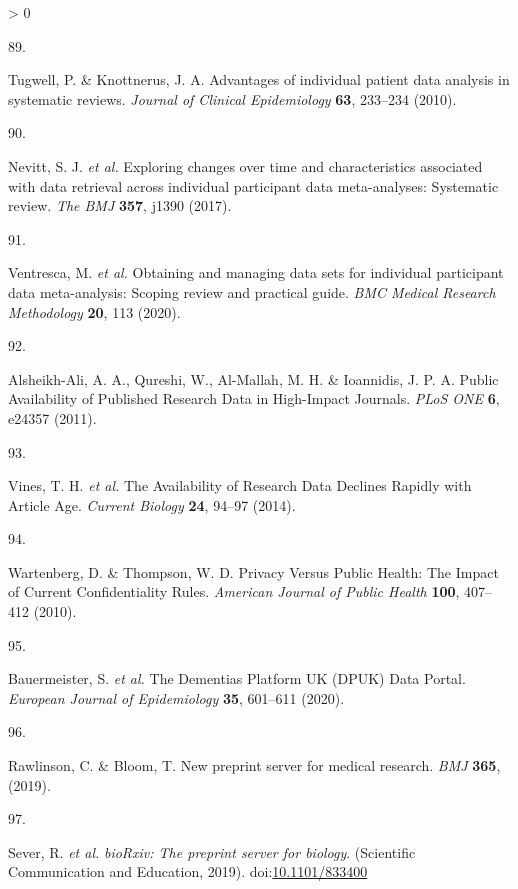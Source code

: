 \documentclass[a4paper, twoside]{templates/ociamthesis}
\newlength{\cslhangindent}
\newlength{\csllabelwidth}
\newenvironment{CSLReferences}[3] %
 {%
  \setlength{\parindent}{0pt}
  \ifodd #1 \everypar{\setlength{\hangindent}{\cslhangindent}}\ignorespaces\fi
  \ifnum #2 > 0
  \setlength{\parskip}{#2\baselineskip}
  \fi
 }%
 {}
\newcommand{\CSLLeftMargin}[1]{\parbox[t]{\maxof{\widthof{#1}}{\csllabelwidth}}{#1}}
\newcommand{\CSLRightInline}[1]{\parbox[t]{\linewidth - \csllabelwidth}{#1}}
\begin{document}
\begin{CSLReferences}{0}{0}
\leavevmode\hypertarget{ref-tugwell2010}{}%
\CSLLeftMargin{89. }
\CSLRightInline{Tugwell, P. \& Knottnerus, J. A. Advantages of individual patient data analysis in systematic reviews. \emph{Journal of Clinical Epidemiology} \textbf{63}, 233--234 (2010).}

\leavevmode\hypertarget{ref-nevitt2017a}{}%
\CSLLeftMargin{90. }
\CSLRightInline{Nevitt, S. J. \emph{et al.} Exploring changes over time and characteristics associated with data retrieval across individual participant data meta-analyses: Systematic review. \emph{The BMJ} \textbf{357}, j1390 (2017).}

\leavevmode\hypertarget{ref-ventresca2020}{}%
\CSLLeftMargin{91. }
\CSLRightInline{Ventresca, M. \emph{et al.} Obtaining and managing data sets for individual participant data meta-analysis: Scoping review and practical guide. \emph{BMC Medical Research Methodology} \textbf{20}, 113 (2020).}

\leavevmode\hypertarget{ref-alsheikh-ali2011}{}%
\CSLLeftMargin{92. }
\CSLRightInline{Alsheikh-Ali, A. A., Qureshi, W., Al-Mallah, M. H. \& Ioannidis, J. P. A. Public {Availability} of {Published Research Data} in {High}-{Impact Journals}. \emph{PLoS ONE} \textbf{6}, e24357 (2011).}

\leavevmode\hypertarget{ref-vines2014}{}%
\CSLLeftMargin{93. }
\CSLRightInline{Vines, T. H. \emph{et al.} The {Availability} of {Research Data Declines Rapidly} with {Article Age}. \emph{Current Biology} \textbf{24}, 94--97 (2014).}

\leavevmode\hypertarget{ref-wartenberg2010}{}%
\CSLLeftMargin{94. }
\CSLRightInline{Wartenberg, D. \& Thompson, W. D. Privacy {Versus Public Health}: {The Impact} of {Current Confidentiality Rules}. \emph{American Journal of Public Health} \textbf{100}, 407--412 (2010).}

\leavevmode\hypertarget{ref-bauermeister2020}{}%
\CSLLeftMargin{95. }
\CSLRightInline{Bauermeister, S. \emph{et al.} The {Dementias Platform UK} ({DPUK}) {Data Portal}. \emph{European Journal of Epidemiology} \textbf{35}, 601--611 (2020).}

\leavevmode\hypertarget{ref-rawlinson2019}{}%
\CSLLeftMargin{96. }
\CSLRightInline{Rawlinson, C. \& Bloom, T. New preprint server for medical research. \emph{BMJ} \textbf{365}, (2019).}

\leavevmode\hypertarget{ref-sever2019}{}%
\CSLLeftMargin{97. }
\CSLRightInline{Sever, R. \emph{et al.} \emph{{bioRxiv}: The preprint server for biology}. ({Scientific Communication and Education}, 2019). doi:\href{https://doi.org/10.1101/833400}{10.1101/833400}}


\end{CSLReferences}
\end{document}
